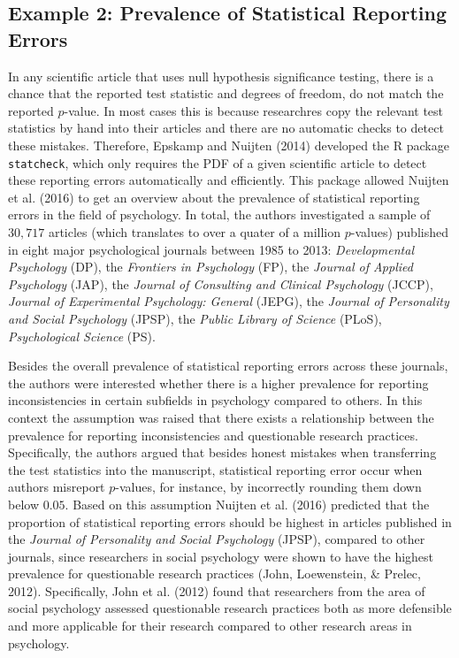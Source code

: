 \documentclass[
  english,
  man,floatsintext]{apa6}
\begin{document}
\hypertarget{example-2-prevalence-of-statistical-reporting-errors}{%
\subsection{Example 2: Prevalence of Statistical Reporting Errors}\label{example-2-prevalence-of-statistical-reporting-errors}}

In any scientific article that uses null hypothesis significance testing, there is a chance that the reported test statistic and degrees of freedom, do not match the reported \(p\)-value. In most cases this is because researchres copy the relevant test statistics by hand into their articles and there are no automatic checks to detect these mistakes. Therefore, Epskamp and Nuijten (2014) developed the R package \texttt{statcheck}, which only requires the PDF of a given scientific article to detect these reporting errors automatically and efficiently. This package allowed Nuijten et al. (2016) to get an overview about the prevalence of statistical reporting errors in the field of psychology. In total, the authors investigated a sample of \(30,717\) articles (which translates to over a quater of a million \(p\)-values) published in eight major psychological journals between 1985 to 2013: \emph{Developmental Psychology} (DP), the \emph{Frontiers in Psychology} (FP), the \emph{Journal of Applied Psychology} (JAP), the \emph{Journal of Consulting and Clinical Psychology} (JCCP), \emph{Journal of Experimental Psychology: General} (JEPG), the \emph{Journal of Personality and Social Psychology} (JPSP), the \emph{Public Library of Science} (PLoS), \emph{Psychological Science} (PS).

Besides the overall prevalence of statistical reporting errors across these journals, the authors were interested whether there is a higher prevalence for reporting inconsistencies in certain subfields in psychology compared to others. In this context the assumption was raised that there exists a relationship between the prevalence for reporting inconsistencies and questionable research practices. Specifically, the authors argued that besides honest mistakes when transferring the test statistics into the manuscript, statistical reporting error occur when authors misreport \(p\)-values, for instance, by incorrectly rounding them down below \(0.05\). Based on this assumption Nuijten et al. (2016) predicted that the proportion of statistical reporting errors should be highest in articles published in the \emph{Journal of Personality and Social Psychology} (JPSP), compared to other journals, since researchers in social psychology were shown to have the highest prevalence for questionable research practices (John, Loewenstein, \& Prelec, 2012). Specifically, John et al. (2012) found that researchers from the area of social psychology assessed questionable research practices both as more defensible and more applicable for their research compared to other research areas in psychology.
\end{document}
